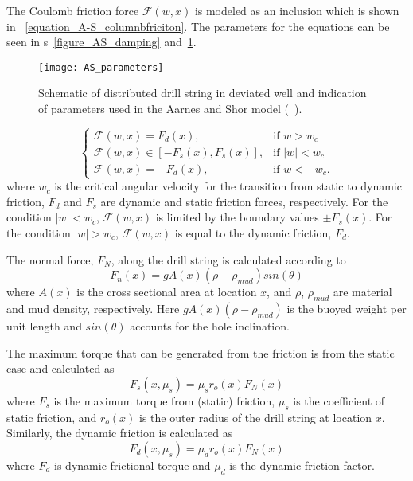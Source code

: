 The Coulomb friction force $\mathcal{F}(w,x)$ is modeled as an inclusion which is shown in \equationname~\ref{equation_A-S_columnbfriciton}. The parameters for the equations can be seen in \figurename{}s~\ref{figure_AS_damping} and~\ref{figure_AS_equation_schematic}.
\begin{figure}
	\centering
	\texttt{[image: AS\_parameters]}
    \caption[Schematic of distributed drill string in deviated well]{Schematic of distributed drill string in deviated well and indication of parameters used in the Aarnes and Shor model (~\cite{ref:aarsnes2017a}).}
	\label{figure_AS_equation_schematic}
\end{figure}
\begin{equation}
	\label{equation_A-S_columnbfriciton}
	\begin{cases}
		\mathcal{F}(w,x) = F_{d}(x), & \mbox{if } w>w_c \\
		\mathcal{F}(w,x) \in [-F_{s}(x), F_{s}(x)], & \mbox{if } |w|<w_c \ \\
		\mathcal{F}(w,x) = -F_{d}(x), & \mbox{if } w < -w_c.
	\end{cases}
\end{equation}
where $w_c$ is the critical angular velocity for the transition from static to dynamic friction, $F_{d}$ and $F_{s}$ are dynamic and static friction forces, respectively. For the condition $|w|<w_c$, $\mathcal{F}(w,x)$ is limited by the boundary values $\pm F_{s}(x)$.  For the condition $|w|>w_c$,  $\mathcal{F}(w,x)$ is equal to the dynamic friction, $F_{d}$.

The normal force, $F_N$, along the drill string is calculated according to
\begin{equation}\label{equation_AS_normal_force}
  F_n(x) = gA(x)(\rho-\rho_{mud})sin(\theta)
\end{equation}
where $A(x)$ is the cross sectional area at location $x$, and $\rho$, $\rho_{mud}$ are material and mud density, respectively.  Here $gA(x)(\rho-\rho_{mud})$ is the buoyed weight per unit length and $sin(\theta)$ accounts for the hole inclination.

The maximum torque that can be generated from the friction is from the static case and calculated as
\begin{equation}\label{equation_A-S_static_fric}
  F_{s}(x,\mu_s) = \mu_s r_o(x) F_N(x)
\end{equation}
where $F_{s}$ is the maximum torque from (static) friction, $\mu_s$ is the coefficient of static friction, and $r_o(x)$ is the outer radius of the drill string at location $x$. Similarly, the dynamic friction is calculated as
\begin{equation}\label{equation_A-S_dynamic_fric}
  F_{d}(x,\mu_s) = \mu_d r_o(x) F_N(x)
\end{equation}
where $F_d$ is dynamic frictional torque and $\mu_d$ is the dynamic friction factor.

